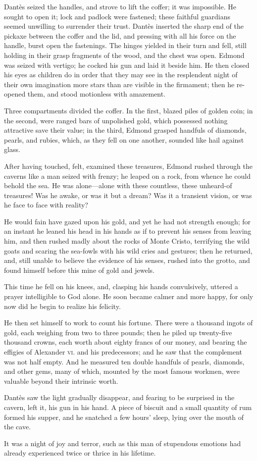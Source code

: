  Dantès seized the handles, and strove to lift the coffer; it was impossible. He sought to open it; lock and padlock were fastened; these faithful guardians seemed unwilling to surrender their trust. Dantès inserted the sharp end of the pickaxe between the coffer and the lid, and pressing with all his force on the handle, burst open the fastenings. The hinges yielded in their turn and fell, still holding in their grasp fragments of the wood, and the chest was open.  Edmond was seized with vertigo; he cocked his gun and laid it beside him. He then closed his eyes as children do in order that they may see in the resplendent night of their own imagination more stars than are visible in the firmament; then he re-opened them, and stood motionless with amazement. 

 Three compartments divided the coffer. In the first, blazed piles of golden coin; in the second, were ranged bars of unpolished gold, which possessed nothing attractive save their value; in the third, Edmond grasped handfuls of diamonds, pearls, and rubies, which, as they fell on one another, sounded like hail against glass. 

 After having touched, felt, examined these treasures, Edmond rushed through the caverns like a man seized with frenzy; he leaped on a rock, from whence he could behold the sea. He was alone—alone with these countless, these unheard-of treasures! Was he awake, or was it but a dream? Was it a transient vision, or was he face to face with reality? 

 He would fain have gazed upon his gold, and yet he had not strength enough; for an instant he leaned his head in his hands as if to prevent his senses from leaving him, and then rushed madly about the rocks of Monte Cristo, terrifying the wild goats and scaring the sea-fowls with his wild cries and gestures; then he returned, and, still unable to believe the evidence of his senses, rushed into the grotto, and found himself before this mine of gold and jewels. 

 This time he fell on his knees, and, clasping his hands convulsively, uttered a prayer intelligible to God alone. He soon became calmer and more happy, for only now did he begin to realize his felicity. 

 He then set himself to work to count his fortune. There were a thousand ingots of gold, each weighing from two to three pounds; then he piled up twenty-five thousand crowns, each worth about eighty francs of our money, and bearing the effigies of Alexander \textsc{vi.} and his predecessors; and he saw that the complement was not half empty. And he measured ten double handfuls of pearls, diamonds, and other gems, many of which, mounted by the most famous workmen, were valuable beyond their intrinsic worth. 

 Dantès saw the light gradually disappear, and fearing to be surprised in the cavern, left it, his gun in his hand. A piece of biscuit and a small quantity of rum formed his supper, and he snatched a few hours' sleep, lying over the mouth of the cave. 

 It was a night of joy and terror, such as this man of stupendous emotions had already experienced twice or thrice in his lifetime. 